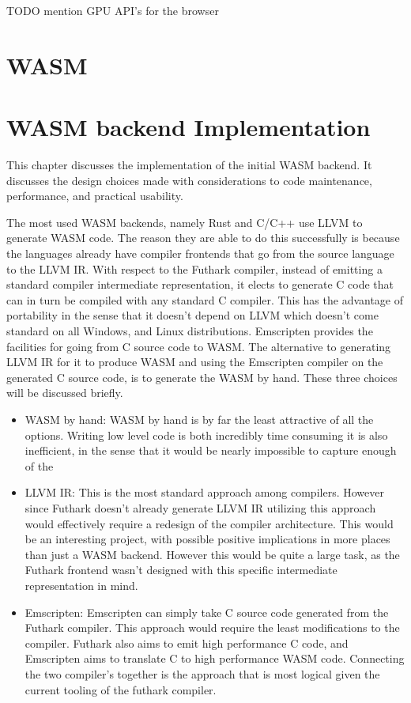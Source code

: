 \documentclass[11pt]{book}
\begin{document}
TODO mention GPU API's for the browser








\chapter{WASM}



\chapter{WASM backend Implementation}

This chapter discusses the implementation of the initial WASM backend. It discusses the design choices made with considerations to code maintenance, performance, and practical usability. 




The most used WASM backends, namely Rust and C/C++ use LLVM to generate WASM code. The reason they are able to do this successfully is because the languages already have compiler frontends that go from the source language to the LLVM IR. With respect to the Futhark compiler, instead of emitting a standard compiler intermediate representation, it elects to generate C code that can in turn be compiled with any standard C compiler. This has the advantage of portability in the sense that it doesn't depend on LLVM which doesn't come standard on all Windows, and Linux distributions. Emscripten provides the facilities for going from C source code to WASM. The alternative to generating LLVM IR for it to produce WASM and using the Emscripten compiler on the generated C source code, is to generate the WASM by hand. These three choices will be discussed briefly.

\begin{itemize}
    \item WASM by hand: 
        WASM by hand is by far the least attractive of all the options. Writing low level code is both incredibly time consuming it is also inefficient, in the sense that it would be nearly impossible to capture enough of the  
    \item LLVM IR: This is the most standard approach among compilers. However since Futhark doesn't already generate LLVM IR utilizing this approach would effectively require a redesign of the compiler architecture. This would be an interesting project, with possible positive implications in more places than just a WASM backend. However this would be quite a large task, as the Futhark frontend wasn't designed with this specific intermediate representation in mind. 
    \item Emscripten: Emscripten can simply take C source code generated from the Futhark compiler. This approach would require the least modifications to the compiler. Futhark also aims to emit high performance C code, and Emscripten aims to translate C to high performance WASM code. Connecting the two compiler's together is the approach that is most logical given the current tooling of the futhark compiler.
\end{itemize}
\end{document}
